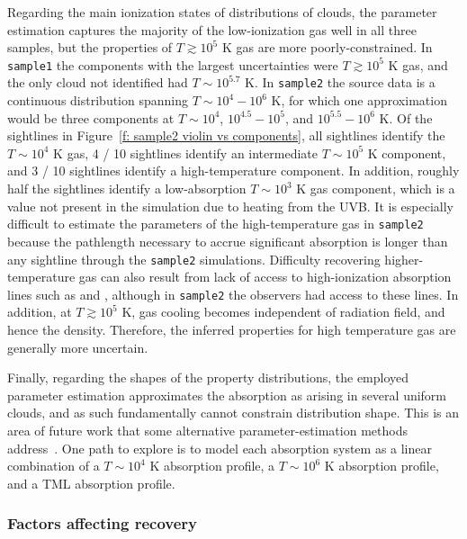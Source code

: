 \documentclass[fleqn,usenatbib]{mnras}
\begin{document}
Regarding the main ionization states of distributions of clouds,
the parameter estimation captures the majority of the low-ionization gas well in all three samples, but the properties of $T \gtrsim 10^5$ K gas are more poorly-constrained.
In \texttt{sample1} the components with the largest uncertainties were $T \gtrsim 10^5$ K gas,
and the only cloud not identified had $T \sim 10^{5.7}$ K.
In \texttt{sample2} the source data is a continuous distribution spanning $T \sim 10^4 - 10^6$ K,
for which one approximation would be three components at $T\sim 10^4$, $10^{4.5}-10^5$, and $10^{5.5}-10^6$ K.
Of the sightlines in Figure~\ref{f: sample2 violin vs components}, 
all sightlines identify the $T \sim 10^4$ K gas,
4 / 10 sightlines identify an intermediate $T \sim 10^5$ K component,
and 3 / 10 sightlines identify a high-temperature component.
In addition, roughly half the sightlines identify a low-absorption $T \sim 10^3$ K gas component, which is a value not present in the simulation due to heating from the UVB.
It is especially difficult to estimate the parameters of the high-temperature gas in \texttt{sample2} because the pathlength necessary to accrue significant absorption is longer than any sightline through the \texttt{sample2} simulations.
Difficulty recovering higher-temperature gas can also result from lack of access to high-ionization absorption lines such as  and ,
although in \texttt{sample2} the observers had access to these lines.
In addition, at $T \gtrsim 10^5$ K, gas cooling becomes independent of radiation field, and hence the density. 
Therefore, the inferred properties for high temperature gas are generally more uncertain.

Finally, regarding the shapes of the property distributions,
the employed parameter estimation approximates the absorption as arising in several uniform clouds,
and as such fundamentally cannot constrain distribution shape.
This is an area of future work that some alternative parameter-estimation methods address~\citep[Multidensity Cool Cloud Model;][]{stern2016Universal}.
One path to explore is to model each absorption system as a linear combination of a $T \sim 10^4$ K absorption profile, a $T \sim 10^6$ K absorption profile, and a TML absorption profile.

\subsubsection{Factors affecting recovery}
\label{s: discussion -- cloud structure -- factors}
\end{document}
